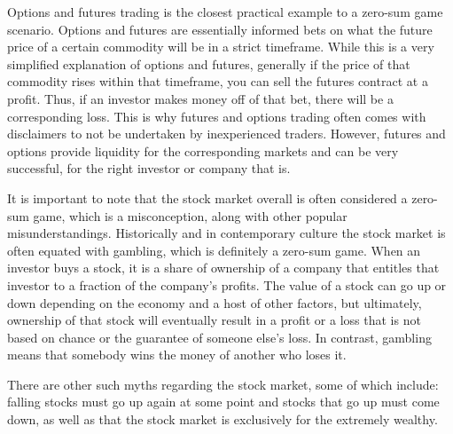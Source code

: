 Options and futures trading is the closest practical example to a zero-sum game scenario. Options and futures are essentially informed bets on what the future price of a certain commodity will be in a strict timeframe. While this is a very simplified explanation of options and futures, generally if the price of that commodity rises within that timeframe, you can sell the futures contract at a profit. Thus, if an investor makes money off of that bet, there will be a corresponding loss. This is why futures and options trading often comes with disclaimers to not be undertaken by inexperienced traders. However, futures and options provide liquidity for the corresponding markets and can be very successful, for the right investor or company that is.

It is important to note that the stock market overall is often considered a zero-sum game, which is a misconception, along with other popular misunderstandings. Historically and in contemporary culture the stock market is often equated with gambling, which is definitely a zero-sum game. When an investor buys a stock, it is a share of ownership of a company that entitles that investor to a fraction of the company's profits. The value of a stock can go up or down depending on the economy and a host of other factors, but ultimately, ownership of that stock will eventually result in a profit or a loss that is not based on chance or the guarantee of someone else's loss. In contrast, gambling means that somebody wins the money of another who loses it.

There are other such myths regarding the stock market, some of which include: falling stocks must go up again at some point and stocks that go up must come down, as well as that the stock market is exclusively for the extremely wealthy.